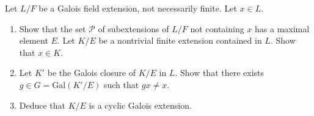 \begin{exercise}
\label{algebra:2017:3}
Let $L/F$ be a Galois field extension, not necessarily finite. Let $x \in L$.

\begin{enumerate}
\item Show that the set $\mathcal{P}$ of subextensions of $L/F$ not containing $x$ has a maximal element $E$. Let $K/E$ be a nontrivial finite extension contained in $L$. Show that $x \in K$.

\item Let $K'$ be the Galois closure of $K/E$ in $L$. Show that there exists $g \in G = \mathrm{Gal}(K'/E)$ such that $gx \neq x$.

\item Deduce that $K/E$ is a cyclic Galois extension.
\end{enumerate}
\end{exercise}
